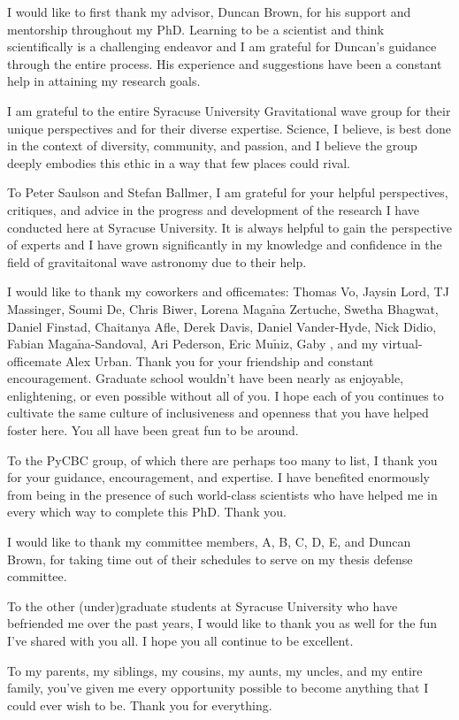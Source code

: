 I would like to first thank my advisor, Duncan Brown, for his support and mentorship throughout my PhD. Learning
to be a scientist and think scientifically is a challenging endeavor and I am grateful for Duncan's guidance through
the entire process. His experience and suggestions have been a constant help in attaining my research goals.

I am grateful to the entire Syracuse University Gravitational wave group for their unique perspectives and for their
diverse expertise. Science, I believe, is best done in the context of diversity, community, and passion, and I believe
the group deeply embodies this ethic in a way that few places could rival.

To Peter Saulson and Stefan Ballmer, I am grateful for your helpful perspectives, critiques, and advice in the
progress and development of the research I have conducted here at Syracuse University. It is always helpful to
gain the perspective of experts and I have grown significantly in my knowledge and confidence in the field of
gravitaitonal wave astronomy due to their help.

I would like to thank my coworkers and officemates: Thomas Vo, Jaysin Lord, TJ Massinger, Soumi De, Chris Biwer,
Lorena Maga$\tilde{\text{n}}$a Zertuche, Swetha Bhagwat, Daniel Finstad, Chaitanya Afle, Derek Davis, Daniel Vander-Hyde, Nick Didio,
Fabian Maga$\tilde{\text{n}}$a-Sandoval, Ari Pederson, Eric Mu$\tilde{\text{n}}$iz, Gaby , and my virtual-officemate Alex Urban.
Thank you for your friendship and constant encouragement.
Graduate school wouldn't have been nearly as enjoyable, enlightening, or even possible without all of you.
I hope each of you continues to
cultivate the same culture of inclusiveness and openness that you have helped foster here. You all have been great fun to be around.

To the PyCBC group, of which there are perhaps too many to list, I thank you for your guidance, encouragement, and
expertise. I have benefited enormously from being in the presence of such world-class scientists who have helped
me in every which way to complete this PhD. Thank you. 

I would like to thank my committee members, A, B, C, D, E, 
and Duncan Brown, for taking time out of their schedules to serve on my thesis defense committee.

To the other (under)graduate students at Syracuse University who have befriended me over the past years, I would
like to thank you as well for the fun I've shared with you all. I hope you all continue to be excellent. 

To my parents, my siblings, my cousins, my aunts, my uncles, and my entire family, you've given me every opportunity
possible to become anything that I could ever wish to be. Thank you for everything.
